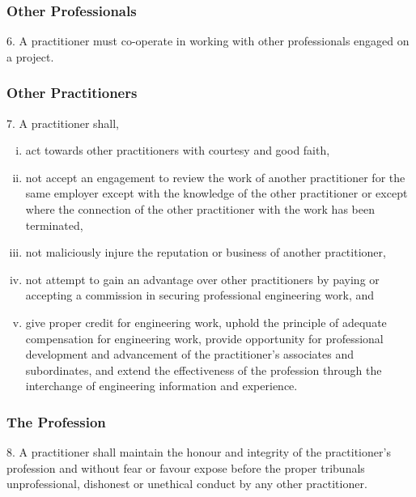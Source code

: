\begin{frame}
\frametitle{Other Professionals}

6. A practitioner must co-operate in working with other professionals engaged on a project.


\end{frame}



\begin{frame}
\frametitle{Other Practitioners}

7. A practitioner shall,

\begin{enumerate}[i)]
\item act towards other practitioners with courtesy and good faith,

\item  not accept an engagement to review the work of another practitioner for the same employer except with the knowledge of the other practitioner or except where the connection of the other practitioner with the work has been terminated,

\item  not maliciously injure the reputation or business of another practitioner,

\item  not attempt to gain an advantage over other practitioners by paying or accepting a commission in securing professional engineering work, and

\item  give proper credit for engineering work, uphold the principle of adequate compensation for engineering work, provide opportunity for professional development and advancement of the practitioner's associates and subordinates, and extend the effectiveness of the profession through the interchange of engineering information and experience.
\end{enumerate}


\end{frame}



\begin{frame}
\frametitle{The Profession}

8. A practitioner shall maintain the honour and integrity of the practitioner's profession and without fear or favour expose before the proper tribunals unprofessional, dishonest or unethical conduct by any other practitioner. 

\end{frame}



